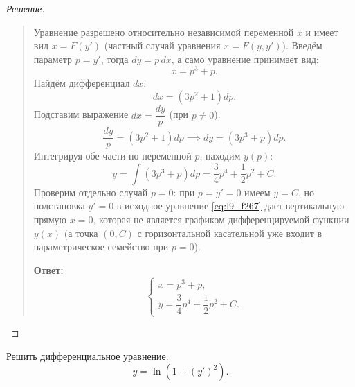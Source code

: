 \begin{proof}[Решение]~\\
    \begin{quote}
        Уравнение разрешено относительно независимой переменной $x$ и имеет вид
        $x = F(y')$ (частный случай уравнения $x = F(y, y')$). Введём параметр
        $p = y'$, тогда $dy = p \, dx$, а само уравнение принимает вид:
        \[
            x = p^3 + p.
        \]
        Найдём дифференциал $dx$:
        \[
            dx = \left(3 p^2 + 1\right) dp.
        \]
        Подставим выражение $dx = \dfrac{dy}{p}$ (при $p \neq 0$):
        \[
            \frac{dy}{p} = \left(3 p^2 + 1\right) dp \implies
            dy = \left(3 p^3 + p\right) dp.
        \]
        Интегрируя обе части по переменной $p$, находим $y(p)$:
        \[
            y = \int \left(3 p^3 + p\right) dp =
            \frac{3}{4} p^4 + \frac{1}{2} p^2 + C.
        \]
        Проверим отдельно случай $p = 0$: при $p = y' = 0$ имеем $y = C$, но
        подстановка $y' = 0$ в исходное уравнение \eqref{eq:l9_f267} даёт
        вертикальную прямую $x = 0$, которая не является графиком дифференцируемой
        функции $y(x)$ (а точка $(0, C)$ с горизонтальной касательной уже
        входит в параметрическое семейство при $p = 0$).

        \textbf{Ответ:}
        \[
            \begin{cases}
                x = p^3 + p, \\[1mm]
                y = \dfrac{3}{4} p^4 + \dfrac{1}{2} p^2 + C.
            \end{cases}
        \]
    \end{quote}
\end{proof}

\begin{problem}[Ф.272]
    Решить дифференциальное уравнение:
    \begin{equation} \label{eq:l9_f272}
        y = \ln\left(1 + (y')^2\right). \tag{14}
    \end{equation}
\end{problem}

